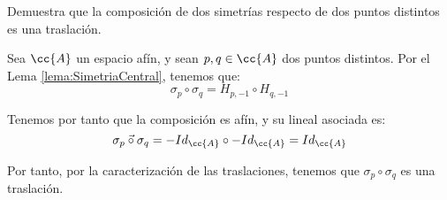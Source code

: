 \begin{ejercicio}
    Demuestra que la composición de dos simetrías respecto de dos puntos distintos es una traslación.

    Sea $\cc{A}$ un espacio afín, y sean $p,q \in \cc{A}$ dos puntos distintos. Por el Lema \ref{lema:SimetriaCentral}, tenemos que:
    \begin{equation*}
        \sigma_p \circ \sigma_q = H_{p, -1} \circ H_{q, -1}
    \end{equation*}

    Tenemos por tanto que la composición es afín, y su lineal asociada es:
    \begin{equation*}
        \vec{\sigma_p \circ \sigma_q} = -Id_{\cc{A}} \circ -Id_{\cc{A}} = Id_{\cc{A}}
    \end{equation*}

    Por tanto, por la caracterización de las traslaciones, tenemos que $\sigma_p \circ \sigma_q$ es una traslación.
\end{ejercicio}